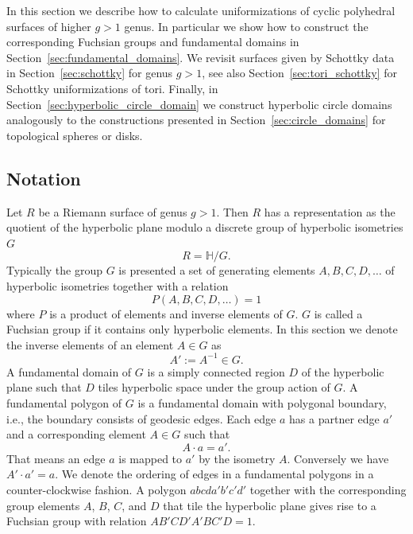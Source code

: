 \documentclass[Thesis]{subfiles}
\begin{document}

In this section we describe how to calculate uniformizations of cyclic polyhedral surfaces of higher $g>1$ genus. 
In particular we show how to construct the corresponding Fuchsian groups and fundamental domains in Section~\ref{sec:fundamental_domains}.
We revisit surfaces given by Schottky data in Section~\ref{sec:schottky} for genus $g>1$, see also Section~\ref{sec:tori_schottky} for Schottky uniformizations of tori.
Finally, in Section~\ref{sec:hyperbolic_circle_domain} we construct hyperbolic circle domains analogously to the constructions presented in Section~\ref{sec:circle_domains} for topological spheres or disks.

\subsection{Notation}

Let $R$ be a Riemann surface of genus $g>1$. 
Then $R$ has a representation as the quotient of the hyperbolic plane modulo a discrete group of hyperbolic isometries $G$
\begin{equation}
R=\mathbb{H} / G.
\end{equation}
Typically the group $G$ is presented a set of generating elements $A,B,C,D,\ldots$ of hyperbolic isometries together with a relation 
\begin{equation}
P(A,B,C,D,\ldots)=1
\end{equation}
where $P$ is a product of elements and inverse elements of $G$. 
$G$ is called a Fuchsian group if it contains only hyperbolic elements.
In this section we denote the inverse elements of an element $A\in G$ as 
\begin{equation}
A':=A^{-1}\in G.
\end{equation}
A fundamental domain of $G$ is a simply connected region $D$ of the hyperbolic plane such that $D$ tiles hyperbolic space under the group action of $G$.
A fundamental polygon of $G$ is a fundamental domain with polygonal boundary, i.e., the boundary consists of geodesic edges.
Each edge $a$ has a partner edge $a'$ and a corresponding element $A\in G$ such that 
\begin{equation}
A\cdot a=a'.
\end{equation}
That means an edge $a$ is mapped to $a'$ by the isometry $A$. Conversely we have $A'\cdot a'=a$.
We denote the ordering of edges in a fundamental polygons in a counter-clockwise fashion. 
A polygon $abcda'b'c'd'$ together with the corresponding group elements $A$, $B$, $C$, and $D$ that tile the hyperbolic plane gives rise to a Fuchsian group with relation $AB'CD'A'BC'D=1$.
\end{document}
